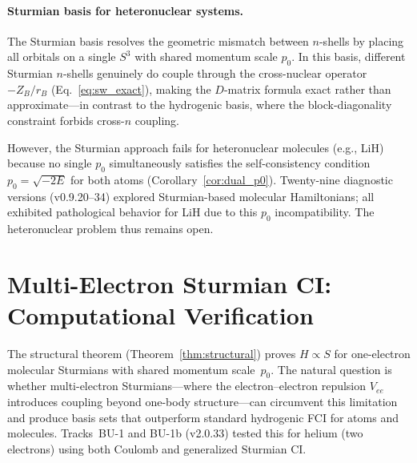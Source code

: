 \documentclass[aps,pra,twocolumn,superscriptaddress,longbibliography]{revtex4-2}
\begin{document}
\paragraph{Sturmian basis for heteronuclear systems.}
The Sturmian basis resolves the geometric mismatch between $n$-shells by
placing all orbitals on a single $S^3$ with shared momentum scale $p_0$.
In this basis, different Sturmian $n$-shells genuinely do couple through
the cross-nuclear operator $-Z_B/r_B$ (Eq.~\eqref{eq:sw_exact}), making
the $D$-matrix formula exact rather than approximate---in contrast to the
hydrogenic basis, where the block-diagonality constraint forbids cross-$n$
coupling.

However, the Sturmian approach fails for heteronuclear molecules (e.g.,
LiH) because no single $p_0$ simultaneously satisfies the
self-consistency condition $p_0 = \sqrt{-2E}$ for both atoms
(Corollary~\ref{cor:dual_p0}).  Twenty-nine diagnostic versions
(v0.9.20--34) explored Sturmian-based molecular Hamiltonians; all
exhibited pathological behavior for LiH due to this $p_0$
incompatibility.  The heteronuclear problem thus remains open.


\section{Multi-Electron Sturmian CI: Computational Verification}
\label{sec:multi_electron}

The structural theorem (Theorem~\ref{thm:structural}) proves
$H \propto S$ for one-electron molecular Sturmians with shared
momentum scale~$p_0$.  The natural question is whether multi-electron
Sturmians---where the electron--electron repulsion $V_{ee}$ introduces
coupling beyond one-body structure---can circumvent this limitation and
produce basis sets that outperform standard hydrogenic FCI for atoms
and molecules.  Tracks~BU-1 and BU-1b (v2.0.33) tested this for
helium (two electrons) using both Coulomb and generalized Sturmian CI.
\end{document}
